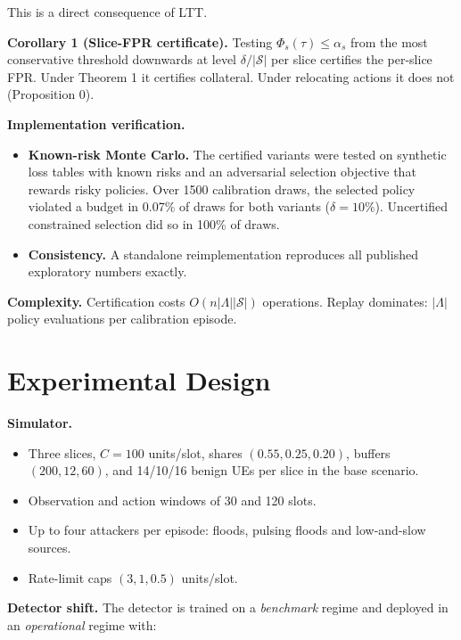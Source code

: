 This is a direct consequence of LTT.

\textbf{Corollary 1 (Slice-FPR certificate).} Testing
\(\Phi_s(\tau)\le\alpha_s\) from the most conservative threshold
downwards at level \(\delta/|\mathcal{S}|\) per slice certifies the
per-slice FPR. Under Theorem 1 it certifies collateral. Under relocating
actions it does not (Proposition 0).

\textbf{Implementation verification.}

\begin{itemize}
\tightlist
\item
  \textbf{Known-risk Monte Carlo.} The certified variants were tested on
  synthetic loss tables with known risks and an adversarial selection
  objective that rewards risky policies. Over 1500 calibration draws,
  the selected policy violated a budget in 0.07\% of draws for both
  variants (\(\delta=10\%\)). Uncertified constrained selection did so
  in 100\% of draws.
\item
  \textbf{Consistency.} A standalone reimplementation reproduces all
  published exploratory numbers exactly.
\end{itemize}

\textbf{Complexity.} Certification costs \(O(n|\Lambda||\mathcal{S}|)\)
operations. Replay dominates: \(|\Lambda|\) policy evaluations per
calibration episode.

\hypertarget{sec:setup}{%
\section{Experimental Design}\label{sec:setup}}

\textbf{Simulator.}

\begin{itemize}
\tightlist
\item
  Three slices, \(C=100\) units/slot, shares \((0.55,0.25,0.20)\),
  buffers \((200,12,60)\), and 14/10/16 benign UEs per slice in the base
  scenario.
\item
  Observation and action windows of 30 and 120 slots.
\item
  Up to four attackers per episode: floods, pulsing floods and
  low-and-slow sources.
\item
  Rate-limit caps \((3,1,0.5)\) units/slot.
\end{itemize}

\textbf{Detector shift.} The detector is trained on a \emph{benchmark}
regime and deployed in an \emph{operational} regime with:

